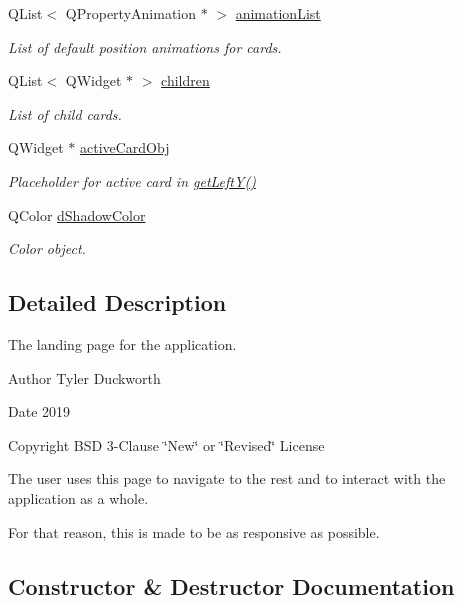 \begin{DoxyCompactItemize}
Q\+List$<$ Q\+Property\+Animation $\ast$ $>$ \mbox{\hyperlink{classHomePage_afe801a94e5ae4b4f136a022bf3410411}{animation\+List}}
\begin{DoxyCompactList}\small\item\em List of default position animations for cards. \end{DoxyCompactList}\item 
Q\+List$<$ Q\+Widget $\ast$ $>$ \mbox{\hyperlink{classHomePage_a0f7d1602b0aa49fbea7693e921e8ab07}{children}}
\begin{DoxyCompactList}\small\item\em List of child cards. \end{DoxyCompactList}\item 
Q\+Widget $\ast$ \mbox{\hyperlink{classHomePage_a36a25c775874418af5e2777c91c3393e}{active\+Card\+Obj}}
\begin{DoxyCompactList}\small\item\em Placeholder for active card in \mbox{\hyperlink{classHomePage_a38c909855e6b1e1a0739642949aa4f9a}{get\+Left\+Y()}} \end{DoxyCompactList}\item 
Q\+Color \mbox{\hyperlink{classHomePage_aa32d795233f9dcc2783c1c68e3de19c9}{d\+Shadow\+Color}}
\begin{DoxyCompactList}\small\item\em Color object. \end{DoxyCompactList}\end{DoxyCompactItemize}


\subsection{Detailed Description}
The landing page for the application. 

\begin{DoxyAuthor}{Author}
Tyler Duckworth 
\end{DoxyAuthor}
\begin{DoxyDate}{Date}
2019 
\end{DoxyDate}
\begin{DoxyCopyright}{Copyright}
B\+SD 3-\/Clause \char`\"{}\+New\char`\"{} or \char`\"{}\+Revised\char`\"{} License
\end{DoxyCopyright}
The user uses this page to navigate to the rest and to interact with the application as a whole.

For that reason, this is made to be as responsive as possible. 

\subsection{Constructor \& Destructor Documentation}
\mbox{\label{classHomePage_a5a47924673356c09cc9269511e07fdf2}} 
